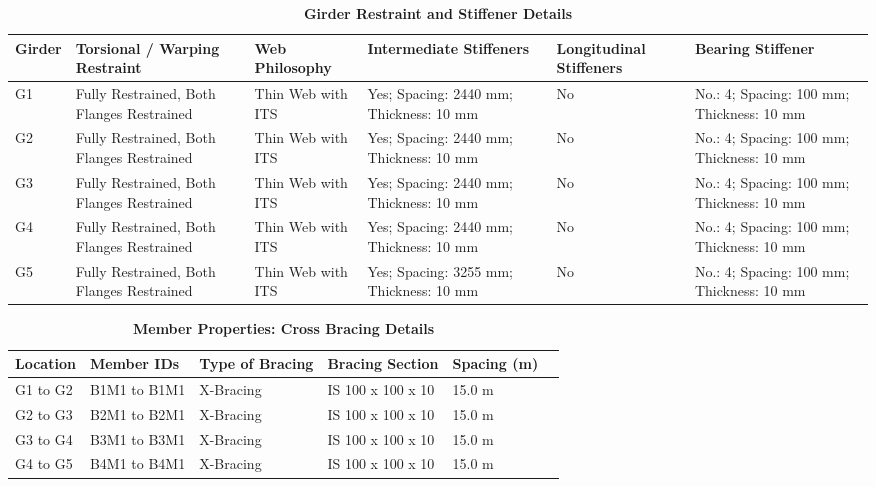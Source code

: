 \documentclass[12pt,a4paper]{report}
\numberwithin{table}{chapter}
\numberwithin{figure}{chapter}
\begin{document}
\vspace{4pt}
\begin{longtable}{|L{1.4cm}|p{2.2cm}|p{2.2cm}|p{3.0cm}|p{2.4cm}|p{2.2cm}|}
\caption{\textbf{Girder Restraint and Stiffener Details}}\\
\hline
\textbf{Girder} & \textbf{Torsional / Warping Restraint} & \textbf{Web Philosophy} & \textbf{Intermediate Stiffeners} & \textbf{Longitudinal Stiffeners} & \textbf{Bearing Stiffener} \\[6pt]
\hline
\endfirsthead
\endhead

G1 & Fully Restrained, Both Flanges Restrained & Thin Web with ITS & Yes; Spacing: 2440 mm; Thickness: 10 mm & No & No.: 4; Spacing: 100 mm; Thickness: 10 mm \\[8pt]
\hline
G2 & Fully Restrained, Both Flanges Restrained & Thin Web with ITS & Yes; Spacing: 2440 mm; Thickness: 10 mm & No & No.: 4; Spacing: 100 mm; Thickness: 10 mm \\[8pt]
\hline
G3 & Fully Restrained, Both Flanges Restrained & Thin Web with ITS & Yes; Spacing: 2440 mm; Thickness: 10 mm & No & No.: 4; Spacing: 100 mm; Thickness: 10 mm \\[8pt]
\hline
G4 & Fully Restrained, Both Flanges Restrained & Thin Web with ITS & Yes; Spacing: 2440 mm; Thickness: 10 mm & No & No.: 4; Spacing: 100 mm; Thickness: 10 mm \\[8pt]
\hline
G5 & Fully Restrained, Both Flanges Restrained & Thin Web with ITS & Yes; Spacing: 3255 mm; Thickness: 10 mm & No & No.: 4; Spacing: 100 mm; Thickness: 10 mm \\[8pt]
\hline
\end{longtable}



\newpage

\vspace{0.4em}
\setlength{\tabcolsep}{4pt}
\setlength\LTleft{0pt}
\setlength\LTright{\fill}

\begin{longtable}{|L{2.2cm}|L{2.2cm}|L{3.0cm}|L{2.5cm}|C{1.8cm}|C{1.8cm}|}
\caption{\textbf{Member Properties: Cross Bracing Details}}
\hline
\textbf{Location} & \textbf{Member IDs} & \textbf{Type of Bracing} & \textbf{Bracing Section} & \textbf{Spacing (m)} \\
\hline
G1 to G2 & B1M1 to B1M1 & X-Bracing & IS 100 x 100 x 10 & 15.0 m \\[6pt]
\hline
G2 to G3 & B2M1 to B2M1 & X-Bracing & IS 100 x 100 x 10 & 15.0 m \\[6pt]
\hline
G3 to G4 & B3M1 to B3M1 & X-Bracing & IS 100 x 100 x 10 & 15.0 m \\[6pt]
\hline
G4 to G5 & B4M1 to B4M1 & X-Bracing & IS 100 x 100 x 10 & 15.0 m \\[6pt]
\hline
\end{longtable}
\end{document}
